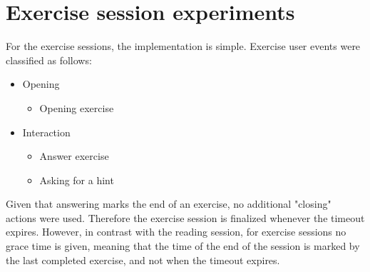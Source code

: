 \begin{table}[!htb]
	\tiny
	\caption{Comparison of working time reported by students vs the time computed by the algorithm (using a timeout value of 2 minutes for reading sessions and 21 seconds for exercise sessions)}\label{tb:comparison_read_time}
\end{table}

\section{Exercise session experiments}
For the exercise sessions, the implementation is simple. Exercise user events were classified as follows:

\begin{itemize}
	\item Opening
		\begin{itemize}
			\item Opening exercise
		\end{itemize}
		
	\item Interaction
		\begin{itemize}
			\item Answer exercise
			\item Asking for a hint
		\end{itemize}
\end{itemize}

Given that answering marks the end of an exercise, no additional "closing" actions were used. Therefore the exercise session is finalized whenever the timeout expires. However, in contrast with the reading session, for exercise sessions no grace time is given, meaning that the time of the end of the session is marked by the last completed exercise, and not when the timeout expires.

